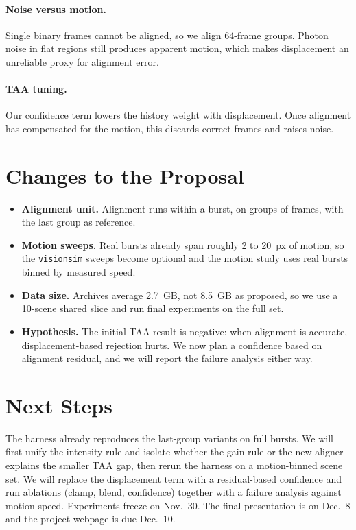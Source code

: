 \documentclass[10pt,twocolumn]{article}
\begin{document}
\paragraph{Noise versus motion.}
Single binary frames cannot be aligned, so we align 64-frame groups. Photon noise in flat regions still produces apparent motion, which makes displacement an unreliable proxy for alignment error.

\paragraph{TAA tuning.}
Our confidence term lowers the history weight with displacement. Once alignment has compensated for the motion, this discards correct frames and raises noise.

\section{Changes to the Proposal}
\label{sec:changes}

\begin{itemize}[leftmargin=1.2em,itemsep=2pt,topsep=3pt]
  \item \textbf{Alignment unit.} Alignment runs within a burst, on groups of frames, with the last group as reference.
  \item \textbf{Motion sweeps.} Real bursts already span roughly 2 to 20~px of motion, so the \texttt{visionsim} sweeps become optional and the motion study uses real bursts binned by measured speed.
  \item \textbf{Data size.} Archives average 2.7~GB, not 8.5~GB as proposed, so we use a 10-scene shared slice and run final experiments on the full set.
  \item \textbf{Hypothesis.} The initial TAA result is negative: when alignment is accurate, displacement-based rejection hurts. We now plan a confidence based on alignment residual, and we will report the failure analysis either way.
\end{itemize}

\section{Next Steps}
\label{sec:next}

The harness already reproduces the last-group variants on full bursts. We will first unify the intensity rule and isolate whether the gain rule or the new aligner explains the smaller TAA gap, then rerun the harness on a motion-binned scene set. We will replace the displacement term with a residual-based confidence and run ablations (clamp, blend, confidence) together with a failure analysis against motion speed. Experiments freeze on Nov.~30. The final presentation is on Dec.~8 and the project webpage is due Dec.~10.
\end{document}
